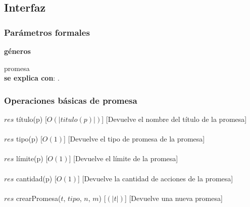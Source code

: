 \subsection{Interfaz}


  \subsubsection{Par\'ametros formales}
   \parbox{1.7cm}{\textbf{g\'eneros}} promesa\\

  \textbf{se explica con}: .


  \subsubsection{Operaciones b\'asicas de promesa}
  {$res$ \igobs t\'itulo(p)}
  [$O(|titulo(p)|)$]
  [Devuelve el nombre del t\'itulo de la promesa]\\\\
  {$res$ \igobs tipo(p)}
  [$O(1)$]
  [Devuelve el tipo de promesa de la promesa]\\\\
  {$res$ \igobs l\'imite(p)}
  [$O(1)$]
  [Devuelve el l\'imite de la promesa]\\\\
  {$res$ \igobs cantidad(p)}
  [$O(1)$]
  [Devuelve la cantidad de acciones de la promesa]\\\\
  {$res$ \igobs crearPromesa($t$, $tipo$, $n$, $m$)}
  [$(|t|)$]
  [Devuelve una nueva promesa]\\\\


